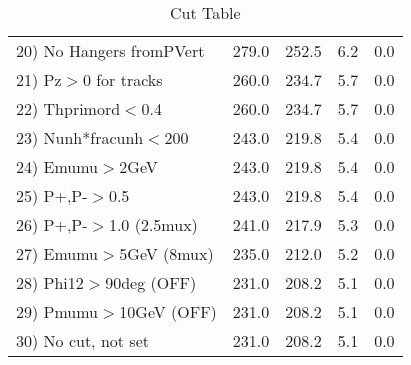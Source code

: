 \begin{table}[h!]
\begin{tabular}{||l||r|r|r|r||}
 20) No Hangers fromPVert &       279.0 &       252.5 &         6.2 &         0.0 \\
 21) Pz$>$0 for tracks    &       260.0 &       234.7 &         5.7 &         0.0 \\
 22) Thprimord$<$0.4      &       260.0 &       234.7 &         5.7 &         0.0 \\
 23) Nunh*fracunh$<$200   &       243.0 &       219.8 &         5.4 &         0.0 \\
 24) Emumu$>$2GeV         &       243.0 &       219.8 &         5.4 &         0.0 \\
 25) P+,P-$>$0.5          &       243.0 &       219.8 &         5.4 &         0.0 \\
 26) P+,P-$>$1.0 (2.5mux) &       241.0 &       217.9 &         5.3 &         0.0 \\
 27) Emumu$>$5GeV  (8mux) &       235.0 &       212.0 &         5.2 &         0.0 \\
 28) Phi12$>$90deg  (OFF) &       231.0 &       208.2 &         5.1 &         0.0 \\
 29) Pmumu$>$10GeV  (OFF) &       231.0 &       208.2 &         5.1 &         0.0 \\
 30) No cut, not set      &       231.0 &       208.2 &         5.1 &         0.0 \\
 \hline
 \hline
 \end{tabular}
 \caption{Cut Table \cohpip }
 \label{tab-cut_copip}
 \end{table}

